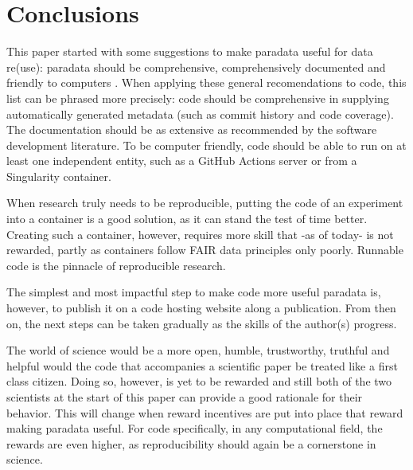 \section{Conclusions}

This paper started with some suggestions to 
make paradata useful for data re(use):
paradata should be comprehensive, comprehensively documented
and friendly to computers \cite{huvila2022improving}.
When applying these general recomendations to code, 
this list can be phrased more precisely:
code should be comprehensive in supplying 
automatically generated metadata (such as commit history and code coverage).
The documentation should be as extensive as recommended by the 
software development literature. To be computer friendly,
code should be able to run on at least one independent entity,
such as a GitHub Actions server or from a Singularity container.


When research truly needs to be reproducible, putting the code 
of an experiment into a container is a good solution, as it 
can stand the test of time better.
Creating such a container, however, requires more skill
that -as of today- is not rewarded,
partly as containers follow FAIR data principles only poorly.
Runnable code is the pinnacle of reproducible research.


The simplest and most impactful step to make code more useful paradata
is, however, to publish it on a code hosting website 
along a publication. From then on, the next steps can be taken 
gradually as the skills of the author(s) progress.


The world of science would be a more open, humble, trustworthy, truthful
and helpful would the code that accompanies a scientific paper
be treated like a first class citizen. 
Doing so, however, is yet to be rewarded
and still both of the two scientists at the start of this paper 
can provide a good rationale for their behavior.
This will change when reward incentives are put into place 
that reward making paradata useful.
For code specifically, in any computational field,
the rewards are even higher, as reproducibility should again be 
a cornerstone in science.

